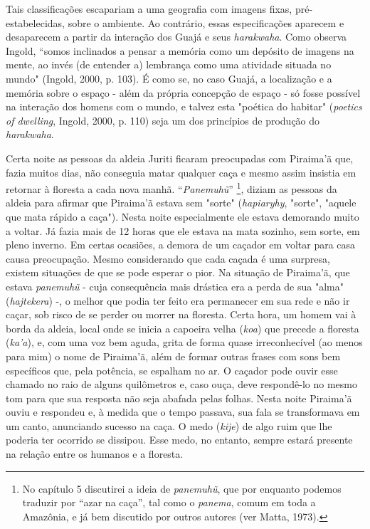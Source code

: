 Tais classificações escapariam a uma geografia com imagens fixas,
pré-estabelecidas, sobre o ambiente. Ao contrário, essas especificações
aparecem e desaparecem a partir da interação dos Guajá e seus
\emph{harakwaha}. Como observa Ingold, ``somos inclinados a pensar a
memória como um depósito de imagens na mente, ao invés (de entender a)
lembrança como uma atividade situada no mundo" (Ingold, 2000, p. 103). É
como se, no caso Guajá, a localização e a memória sobre o espaço - além
da própria concepção de espaço - só fosse possível na interação dos
homens com o mundo, e talvez esta "poética do habitar" (\emph{poetics of
dwelling}, Ingold, 2000, p. 110) seja um dos princípios de produção do
\emph{harakwaha}.

Certa noite as pessoas da aldeia Juriti ficaram preocupadas com
Piraima'ã que, fazia muitos dias, não conseguia matar qualquer caça e
mesmo assim insistia em retornar à floresta a cada nova manhã.
``\emph{Panemuhũ}'' \footnote{No capítulo 5 discutirei a ideia de
  \emph{panemuhũ}, que por enquanto podemos traduzir por ``azar na
  caça'', tal como o \emph{panema}, comum em toda a Amazônia, e já bem
  discutido por outros autores (ver Matta, 1973).}, diziam as pessoas da
aldeia para afirmar que Piraima'ã estava sem "sorte" (\emph{hapiaryhy},
"sorte", "aquele que mata rápido a caça"). Nesta noite especialmente ele
estava demorando muito a voltar. Já fazia mais de 12 horas que ele
estava na mata sozinho, sem sorte, em pleno inverno. Em certas ocasiões,
a demora de um caçador em voltar para casa causa preocupação. Mesmo
considerando que cada caçada é uma surpresa, existem situações de que se
pode esperar o pior. Na situação de Piraima'ã, que estava
\emph{panemuhũ} - cuja consequência mais drástica era a perda de sua
"alma" (\emph{hajtekera}) -, o melhor que podia ter feito era permanecer
em sua rede e não ir caçar, sob risco de se perder ou morrer na
floresta. Certa hora, um homem vai à borda da aldeia, local onde se
inicia a capoeira velha (\emph{koa}) que precede a floresta
(\emph{ka'a}), e, com uma voz bem aguda, grita de forma quase
irreconhecível (ao menos para mim) o nome de Piraima'ã, além de formar
outras frases com sons bem específicos que, pela potência, se espalham
no ar. O caçador pode ouvir esse chamado no raio de alguns quilômetros
e, caso ouça, deve respondê-lo no mesmo tom para que sua resposta não
seja abafada pelas folhas. Nesta noite Piraima'ã ouviu e respondeu e, à
medida que o tempo passava, sua fala se transformava em um canto,
anunciando sucesso na caça. O medo (\emph{kije}) de algo ruim que lhe
poderia ter ocorrido se dissipou. Esse medo, no entanto, sempre estará
presente na relação entre os humanos e a floresta.

